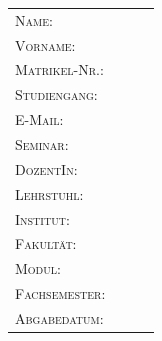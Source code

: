 ﻿\documentclass{Vorlage}
\begin{document}

\begin{titlepage}


\vspace*{6cm}


\vspace{1cm}

\begin{tabular}{p{3.5cm}|p{0.1cm} p{10cm}l}
\textsc{Name:} & & \textsc{}\\
\textsc{Vorname:} & & \textsc{}\\
\textsc{Matrikel-Nr.:} & & \textsc{}\\
\textsc{Studiengang:} & & \textsc{}\\
\textsc{E-Mail:} & & \textsc{}\\
\textsc{Seminar:} & & \textsc{}\\
\textsc{DozentIn:} & & \textsc{}\\
\textsc{Lehrstuhl:} & & \textsc{}\\
\textsc{Institut:} & & \textsc{}\\
\textsc{Fakultät:} & & \textsc{}\\
\textsc{Modul:} & & \textsc{}\\
\textsc{Fachsemester:} & & \textsc{}\\
\textsc{Abgabedatum:} & & \textsc{}\\
\end{tabular}
\end{titlepage}

\restoregeometry


\tableofcontents %

\newpage %

\listoffigures %

\listoftables %

\newpage


\renewcommand{\thesection}{\Roman{section}} %
\end{document}
